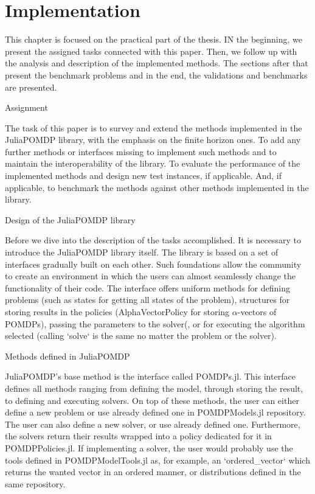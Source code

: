 
\chapter{Implementation}

This chapter is focused on the practical part of the thesis. IN the beginning, we present the assigned tasks connected with this paper. Then, we follow up with the analysis and description of the implemented methods. The sections after that present the benchmark problems and in the end, the validations and benchmarks are presented.

Assignment

The task of this paper is to survey and extend the methods implemented in the JuliaPOMDP library, with the emphasis on the finite horizon ones. To add any further methods or interfaces missing to implement such methods and to maintain the interoperability of the library. To evaluate the performance of the implemented methods and design new test instances, if applicable. And, if applicable, to benchmark the methods against other methods implemented in the library.


Design of the JuliaPOMDP library

Before we dive into the description of the tasks accomplished. It is necessary to introduce the JuliaPOMDP library itself.
The library is based on a set of interfaces gradually built on each other. Such foundations allow the community to create an environment in which the users can almost seamlessly change the functionality of their code. The interface offers uniform methods for defining problems (such as states for getting all states of the problem), structures for storing results in the policies (AlphaVectorPolicy for storing $\alpha$-vectors of POMDPs), passing the parameters to the solver(, or for executing the algorithm selected (calling `solve` is the same no matter the problem or the solver).

Methods defined in JuliaPOMDP

JuliaPOMDP's base method is the interface called POMDPs.jl. This interface defines all methods ranging from defining the model, through storing the result, to defining and executing solvers. On top of these methods, the user can either define a new problem or use already defined one in POMDPModels.jl repository. The user can also define a new solver, or use already defined one. Furthermore, the solvers return their results wrapped into a policy dedicated for it in POMDPPolicies.jl. If implementing a solver, the user would probably use the tools defined in POMDPModelTools.jl as, for example, an `ordered\_vector` which returns the wanted vector in an ordered manner, or distributions defined in the same repository.

